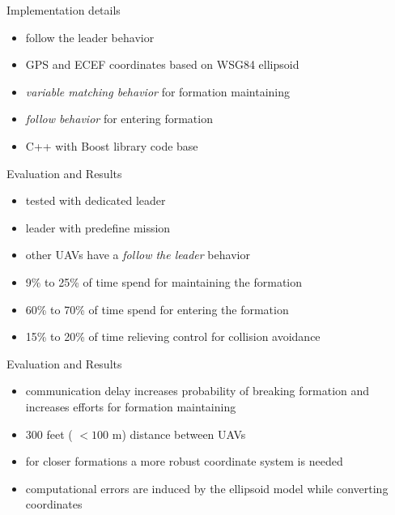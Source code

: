 \documentclass{beamer}
\begin{document}
\begin{frame}{Implementation details}
\begin{itemize}
\item follow the leader behavior
\item GPS and ECEF coordinates based on WSG84 ellipsoid
\item \textit{variable matching behavior} for formation maintaining
\item \textit{follow behavior} for entering formation
\item C++ with Boost library code base
\end{itemize}
\end{frame}

\begin{frame}{Evaluation and Results}
\begin{itemize}
\item tested with dedicated leader
\item leader with predefine mission
\item other UAVs have a \textit{follow the leader} behavior
\item 9\% to 25\% of time spend for maintaining the formation
\item 60\% to 70\% of time spend for entering the formation
\item 15\% to 20\% of time relieving control for collision avoidance
\end{itemize}
\end{frame}

\begin{frame}{Evaluation and Results}
\begin{itemize}
\item communication delay increases probability of breaking formation and increases efforts for formation maintaining
\item 300 feet ( $<100$ m) distance between UAVs
\item for closer formations a more robust coordinate system is needed
\item computational errors are induced by the ellipsoid model while converting coordinates
\end{itemize}
\end{frame}
\end{document}

